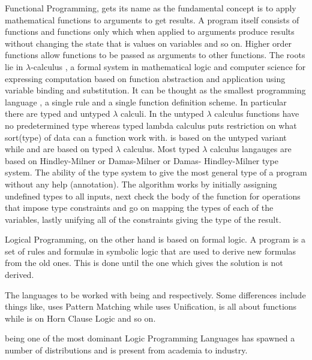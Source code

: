 \documentclass[thesis-solanki.tex]{subfiles}
\begin{document}
Functional Programming, \cite{hughes1989functional} gets its name as the fundamental concept is to apply
mathematical functions to arguments to get results.
A program itself consists of functions and functions only which when applied to arguments produce results without
changing the state that is values on variables and so on.
Higher order functions allow functions to be passed as arguments to other functions.
The roots lie in $\lambda$-calculus \cite{website:lambdacalculuswiki}, a formal system in mathematical logic and
computer science for expressing computation based on function abstraction and application using variable binding
and substitution.
It can be thought as the smallest programming language \cite{rojas2004tutorial}, a single rule and a single
function definition scheme.
In particular there are typed and untyped $\lambda$ calculi.
In the untyped $\lambda$ calculus functions have no predetermined type whereas typed lambda calculus puts
restriction on what sort(type) of data can a function work with.
 is based on the untyped variant while  and  are based on typed
$\lambda$ calculus.
Most typed $\lambda$ calculus langauges are based on Hindley-Milner or Damas-Milner or Damas- Hindley-Milner
\cite{website:hdmtypesystemwiki} type system.
The ability of the type system to give the most general type of a program without any help (annotation).
The algorithm \cite{website:hdmtypesystem} works by initially assigning undefined types to all inputs, next check
the body of the function for operations that impose type constraints and go on mapping the types of each of the
variables, lastly unifying all of the constraints giving the type of the result.

Logical Programming, \cite{spivey1995introduction} on the other hand is based on formal logic.
A program is a set of rules and formul\ae{} in symbolic logic that are used to derive new formulas from the old
ones.
This is done until the one which gives the solution is not derived.

The languages to be worked with being  and  respectively.
Some differences include things like,  uses Pattern Matching while  uses
Unification,  is all about functions while  is on Horn Clause Logic and so
on.

 \cite{wikiprolog} being one of the most dominant Logic Programming Languages has 
spawned a number of distributions and is present from academia to industry.  
\end{document}
